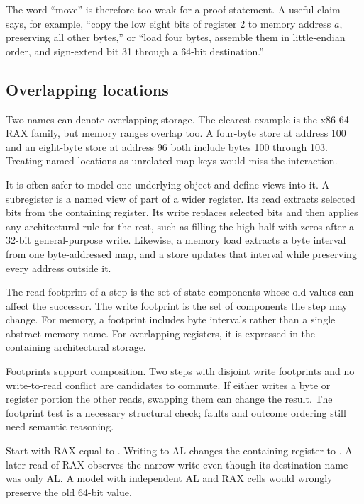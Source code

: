 The word ``move'' is therefore too weak for a proof statement. A useful claim
says, for example, ``copy the low eight bits of register 2 to memory address
\(a\), preserving all other bytes,'' or ``load four bytes, assemble them in
little-endian order, and sign-extend bit 31 through a 64-bit destination.''

\subsection{Overlapping locations}

Two names can denote overlapping storage. The clearest example is the x86-64
RAX family, but memory ranges overlap too. A four-byte store at address 100 and
an eight-byte store at address 96 both include bytes 100 through 103. Treating
named locations as unrelated map keys would miss the interaction.

It is often safer to model one underlying object and define views into it. A
subregister is a named view of part of a wider register. Its read extracts
selected bits from the containing register. Its write replaces selected bits
and then applies any architectural rule for the rest, such as filling the high
half with zeros after a 32-bit general-purpose write.
Likewise, a memory load extracts a byte interval from one byte-addressed map,
and a store updates that interval while preserving every address outside it.

\begin{definition}[title={Read footprint and write footprint}]
The read footprint of a step is the set of state components whose old values
can affect the successor. The write footprint is the set of components the
step may change. For memory, a footprint includes byte intervals rather than a
single abstract memory name. For overlapping registers, it is expressed in
the containing architectural storage.
\end{definition}

Footprints support composition. Two steps with disjoint write footprints and
no write-to-read conflict are candidates to commute. If either writes a byte
or register portion the other reads, swapping them can change the result. The
footprint test is a necessary structural check; faults and outcome ordering
still need semantic reasoning.

\begin{example}[title={A narrow write changes a later wide read}]
Start with RAX equal to . Writing  to AL
changes the containing register to . A later read of
RAX observes the narrow write even though its destination name was only AL.
A model with independent AL and RAX cells would wrongly preserve the old
64-bit value.
\end{example}


